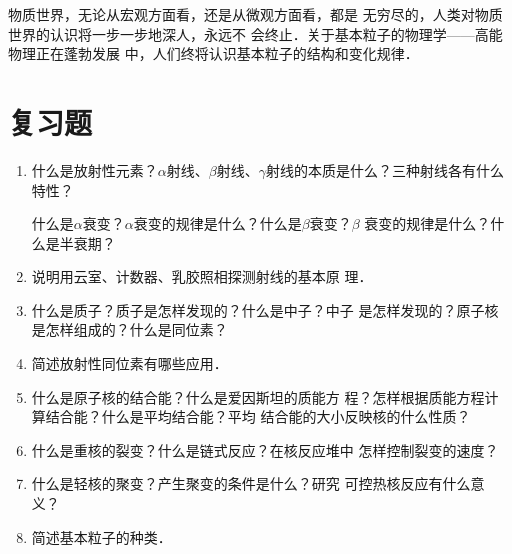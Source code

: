 物质世界，无论从宏观方面看，还是从微观方面看，都是
无穷尽的，人类对物质世界的认识将一步一步地深人，永远不
会终止．关于基本粒子的物理学——高能物理正在蓬勃发展
中，人们终将认识基本粒子的结构和变化规律．


\section*{复习题}
\begin{enumerate}
    \item 什么是放射性元素？$\alpha$射线、$\beta$射线、$\gamma$射线的本质是什么？三种射线各有什么特性？

    什么是$\alpha$衰变？$\alpha$衰变的规律是什么？什么是$\beta$衰变？$\beta$
    衰变的规律是什么？什么是半衰期？
    \item 说明用云室、计数器、乳胶照相探测射线的基本原
    理．
    \item 什么是质子？质子是怎样发现的？什么是中子？中子
    是怎样发现的？原子核是怎样组成的？什么是同位素？
    \item 简述放射性同位素有哪些应用．
    \item 什么是原子核的结合能？什么是爱因斯坦的质能方
    程？怎样根据质能方程计算结合能？什么是平均结合能？平均
    结合能的大小反映核的什么性质？
    \item 什么是重核的裂变？什么是链式反应？在核反应堆中
    怎样控制裂变的速度？
    \item 什么是轻核的聚变？产生聚变的条件是什么？研究
    可控热核反应有什么意义？
    \item 简述基本粒子的种类．
\end{enumerate}


